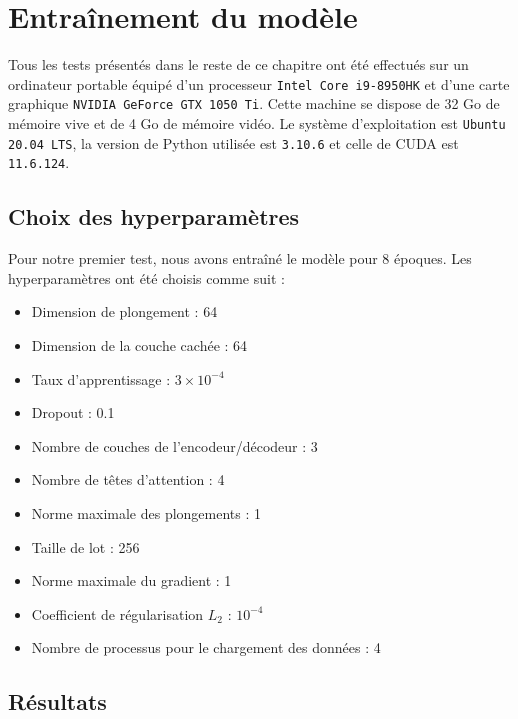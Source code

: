 \section{Entraînement du modèle}%
\label{sec.results.training}

Tous les tests présentés dans le reste de ce chapitre ont été effectués sur un ordinateur portable 
équipé d'un processeur \verb|Intel Core i9-8950HK| et d'une carte graphique \verb|NVIDIA GeForce GTX 1050 Ti|.
Cette machine se dispose de 32 Go de mémoire vive et de 4 Go de mémoire vidéo.
Le système d'exploitation est \verb|Ubuntu 20.04 LTS|, 
la version de Python utilisée est \verb|3.10.6|
et celle de CUDA est \verb|11.6.124|.


\subsection{Choix des hyperparamètres}%
\label{sub.results.training.hyperparameters}

Pour notre premier test, nous avons entraîné le modèle pour 8 époques.
Les hyperparamètres ont été choisis comme suit :
\begin{itemize}
    \item Dimension de plongement : 64
    \item Dimension de la couche cachée : 64
    \item Taux d'apprentissage : \(3 \times 10^{-4}\)
    \item Dropout : 0.1
    \item Nombre de couches de l'encodeur/décodeur : 3
    \item Nombre de têtes d'attention : 4
    \item Norme maximale des plongements : 1
    \item Taille de lot : 256
    \item Norme maximale du gradient : 1
    \item Coefficient de régularisation \(L_2\) : \(10^{-4}\)
    \item Nombre de processus pour le chargement des données : 4
\end{itemize}


\subsection{Résultats}%
\label{sub.results.training.results}

